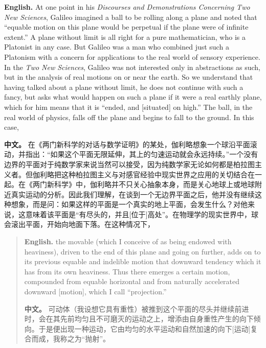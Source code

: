 \noindent\textbf{English.} At one point in his \emph{Discourses and Demonstrations Concerning Two New Sciences}, Galileo imagined a ball to be rolling along a plane and noted that ``equable motion on this plane would be perpetual if the plane were of infinite extent.'' A plane without limit is all right for a pure mathematician, who is a Platonist in any case. But Galileo was a man who combined just such a Platonism with a concern for applications to the real world of sensory experience. In the \emph{Two New Sciences}, Galileo was not interested only in abstractions as such, but in the analysis of real motions on or near the earth. So we understand that having talked about a plane without limit, he does not continue with such a fancy, but asks what would happen on such a plane if it were a real earthly plane, which for him means that it is ``ended, and [situated] on high.'' The ball, in the real world of physics, falls off the plane and begins to fall to the ground. In this case,
\par\noindent\textbf{中文。} 在《两门新科学的对话与数学证明》的某处，伽利略想象一个球沿平面滚动，并指出：“如果这个平面无限延伸，其上的匀速运动就会永远持续。”一个没有边界的平面对于纯数学家来说当然可以接受，因为纯数学家无论如何都是柏拉图主义者。但伽利略把这种柏拉图主义与对感官经验中现实世界之应用的关切结合在一起。在《两门新科学》中，伽利略并不只关心抽象本身，而是关心地球上或地球附近真实运动的分析。因此我们理解，在谈到一个无边界平面之后，他并没有继续这种想象，而是问：如果这样的平面是一个真实的地上平面，会发生什么？对他来说，这意味着该平面是“有尽头的，并且[位于]高处”。在物理学的现实世界中，球会滚出平面，开始向地面下落。在这种情况下，
\medskip

\begin{quote}
\noindent\textbf{English.} the movable (which I conceive of as being endowed with heaviness), driven to the end of this plane and going on further, adds on to its previous equable and indelible motion that downward tendency which it has from its own heaviness. Thus there emerges a certain motion, compounded from equable horizontal and from naturally accelerated downward [motion], which I call ``projection.''
\par\noindent\textbf{中文。} 可动体（我设想它具有重性）被推到这个平面的尽头并继续前进时，会在其先前均匀且不可磨灭的运动之上，增添由自身重性产生的向下倾向。于是便出现一种运动，它由均匀的水平运动和自然加速的向下[运动]复合而成，我称之为“抛射”。
\end{quote}

